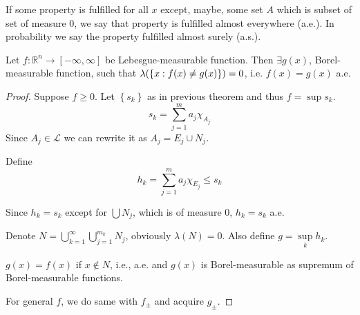 \begin{definition}
	If some property is fulfilled for all $x$ except, maybe, some set $A$ which is subset of set of measure $0$, we say that property is fulfilled almost everywhere (a.e.). In probability we say the property fulfilled almost surely (a.s.). 
\end{definition}
\begin{theorem}
	Let $f: \mathbb{R}^n \to [-\infty, \infty]$ be Lebesgue-measurable function. Then  $\exists g(x)$, Borel-measurable function, such that $\lambda\qty(\left\{ x: f(x) \neq g(x) \right\}) = 0$, i.e. $f(x)=g(x)$ a.e.
	
	\begin{proof}
		Suppose $f\geq 0$. Let $\left\{ s_k\right\}$ as in previous theorem and thus $f=\sup s_k$. 
		$$s_k = \sum_{j=1}^m a_j \chi_{A_j}$$
		Since $A_j \in \mathcal{L}$ we can rewrite it as $A_j = E_j \cup N_j$.
		
		Define $$h_k = \sum_{j=1}^m a_j \chi_{E_j} \leq s_k$$
		
		Since $h_k = s_k$ except for $\bigcup N_j$, which is of measure $0$, $h_k = s_k$ a.e.
		
		Denote $N = \bigcup_{k=1}^\infty \bigcup_{j=1}^{m_k} N_j$, obviously $\lambda(N) = 0$. Also define $g=\sup\limits_k h_k$.
		
		$g(x)=f(x)$ if $x\notin N$, i.e., a.e. and $g(x)$ is Borel-measurable as supremum of Borel-measurable functions.
		
		For general $f$, we do same with $f_\pm$ and acquire $g_\pm$.
	\end{proof}
\end{theorem}